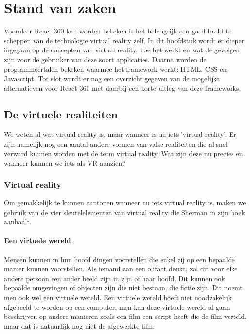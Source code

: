 \chapter{Stand van zaken}
\label{ch:stand-van-zaken}



Vooraleer React 360 kan worden bekeken is het belangrijk een goed beeld te scheppen van de technologie virtual reality zelf. In dit hoofdstuk wordt er dieper ingegaan op de concepten van virtual reality, hoe het werkt en wat de gevolgen zijn voor de gebruiker van deze soort applicaties. Daarna worden de programmeertalen bekeken waarmee het framework werkt: HTML, CSS en Javascript. Tot slot wordt er nog een overzicht gegeven van de mogelijke alternatieven voor React 360 met daarbij een korte uitleg van deze frameworks.

\section{De virtuele realiteiten}
\label{secvirtuele-realiteiten}
We weten al wat virtual reality is, maar wanneer is nu iets 'virtual reality'. Er zijn namelijk nog een aantal andere vormen van valse realiteiten die al snel verward kunnen worden met de term virtual reality. Wat zijn deze nu precies en wanneer kunnen we iets als VR aanzien?

\subsection{Virtual reality}
\label{subsec:virtual-reality}
Om gemakkelijk te kunnen aantonen wanneer nu iets virtual reality is, maken we gebruik van de vier sleutelelementen van virtual reality die Sherman in zijn boek aanhaalt. \autocite{Sherman2000} 

\subsubsection{Een virtuele wereld}
\label{ssubsec:virtuele-wereld}
Mensen kunnen in hun hoofd dingen voorstellen die enkel zij op een bepaalde manier kunnen voorstellen. Als iemand aan een olifant denkt, zal dit voor elke andere persoon een ander beeld zijn in zijn of haar hoofd. Dit kunnen ook bepaalde omgevingen of objecten zijn die niet bestaan, die fictie zijn. Dit noemt men ook wel een virtuele wereld. Een virtuele wereld hoeft niet noodzakelijk afgebeeld te worden op een computer, men kan deze virtuele wereld al gaan beschrijven op andere manieren zoals een film een script heeft die de film verteld, maar dat is natuurlijk nog niet de afgewerkte film.

